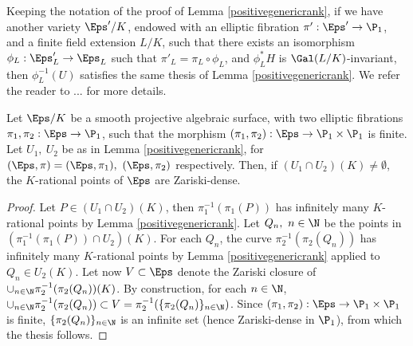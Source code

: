 \begin{remark}\label{geometric}
	Keeping the notation of the proof of Lemma \ref{positivegenericrank}, if we have another variety $\Eps'/K$, endowed with an elliptic fibration $\pi':\Eps'\rightarrow \P_1$, and a finite field extension $L/K$, such that there exists an isomorphism $\phi_L:\Eps'_L\rightarrow \Eps_L$ such that $\pi'_L=\pi_L\circ \phi_L$, and $\phi_L^*H$ is $\Gal(L/K)$-invariant, then $\phi_L^{-1}(U)$ satisfies the same thesis of Lemma \ref{positivegenericrank}. We refer the reader to ... for more details.
\end{remark}


\begin{corollary}\label{zariskidensi}
	Let $\Eps/K$ be a smooth projective algebraic surface, with two elliptic fibrations $\pi_1,\pi_2:\Eps \rightarrow \P_1$, such that the morphism $(\pi_1,\pi_2):\Eps \rightarrow \P_1 \times \P_1$ is finite. Let $U_1, \ U_2$ be as in Lemma \ref{positivegenericrank}, for $(\Eps,\pi)=(\Eps,\pi_1), \ (\Eps, \pi_2)$ respectively. Then, if $(U_1\cap U_2)(K)\neq \emptyset$, the $K$-rational points of $\Eps$ are Zariski-dense.
\end{corollary}
\begin{proof}
	Let $P \in (U_1\cap U_2)(K)$, then $\pi_1^{-1}(\pi_1(P))$ has infinitely many $K$-rational points by Lemma \ref{positivegenericrank}. Let $Q_n, \ n\in \N$ be the points in $(\pi_1^{-1}(\pi_1(P))\cap U_2)(K)$. For each $Q_n$, the curve $\pi_2^{-1}(\pi_2(Q_n))$ has infinitely many $K$-rational points by Lemma \ref{positivegenericrank} applied to $Q_n \in U_2(K)$. Let now $V\subset \Eps$ denote the Zariski closure of $\cup_{n \in \N} \pi_2^{-1}(\pi_2(Q_n))(K)$. By construction, for each $n \in \N$, $\cup_{n \in \N} \pi_2^{-1}(\pi_2(Q_n)) \subset V=\pi_2^{-1} (\{\pi_2(Q_n)\}_{n \in \N})$. Since $(\pi_1,\pi_2):\Eps \rightarrow \P_1 \times \P_1$ is finite, $\{\pi_2(Q_n)\}_{n \in \N}$ is an infinite set (hence Zariski-dense in $\P_1$), from which the thesis follows.
\end{proof}



